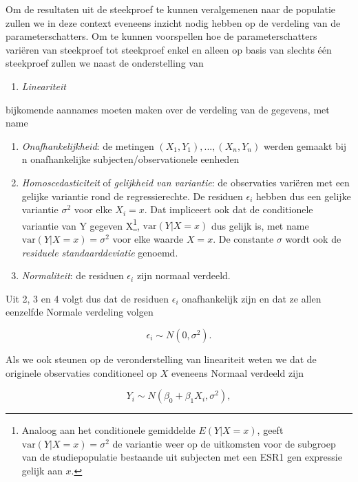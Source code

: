 \documentclass[
  12pt,dutch,coursenotes]{book}
\providecommand{\tightlist}{%
  \setlength{\itemsep}{0pt}\setlength{\parskip}{0pt}}
\begin{document}
Om de resultaten uit de steekproef te kunnen veralgemenen naar de populatie zullen we in deze context eveneens inzicht nodig hebben op de verdeling van de parameterschatters.
Om te kunnen voorspellen hoe de parameterschatters variëren van steekproef tot steekproef enkel en alleen op basis van slechts één steekproef zullen we naast de onderstelling van

\begin{enumerate}
\def\labelenumi{\arabic{enumi}.}
\tightlist
\item
  \emph{Lineariteit}
\end{enumerate}

bijkomende aannames moeten maken over de verdeling van de gegevens, met name

\begin{enumerate}
\def\labelenumi{\arabic{enumi}.}
\setcounter{enumi}{1}
\tightlist
\item
  \emph{Onafhankelijkheid}: de metingen \((X_1,Y_1), ..., (X_n,Y_n)\) werden gemaakt bij n onafhankelijke subjecten/observationele eenheden
\item
  \emph{Homoscedasticiteit} of \emph{gelijkheid van variantie}: de observaties variëren met een gelijke variantie rond de regressierechte. De residuen \(\epsilon_i\) hebben dus een gelijke variantie \(\sigma^2\) voor elke \(X_i=x\). Dat impliceert ook dat de conditionele variantie van Y gegeven X\footnote{Analoog aan het conditionele
    gemiddelde \(E(Y|X=x)\), geeft \(\text{var}(Y\vert X=x) = \sigma^2\) de variantie weer op de uitkomsten voor de subgroep van de studiepopulatie bestaande uit subjecten met een ESR1 gen expressie gelijk aan \(x\).}, \(\text{var}(Y\vert X=x)\) dus gelijk is, met name \(\text{var}(Y\vert X=x) = \sigma^2\) voor elke waarde \(X=x\). De constante \(\sigma\) wordt ook de \emph{residuele standaarddeviatie} genoemd.
\item
  \emph{Normaliteit}: de residuen \(\epsilon_i\) zijn normaal verdeeld.
\end{enumerate}

Uit 2, 3 en 4 volgt dus dat de residuen \(\epsilon_i\) onafhankelijk zijn en dat ze allen eenzelfde Normale verdeling volgen

\[\epsilon_i \sim N(0,\sigma^2).\]

Als we ook steunen op de veronderstelling van lineariteit weten we dat de originele observaties conditioneel op \(X\) eveneens Normaal verdeeld zijn

\[Y_i\sim N(\beta_0+\beta_1 X_i,\sigma^2),\]
\end{document}
